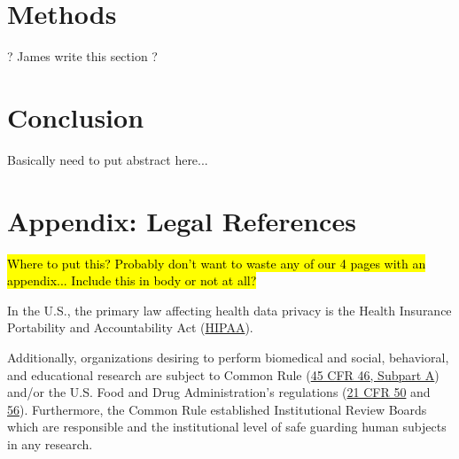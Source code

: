 \documentclass{article}
\begin{document}
\section{Methods}

? James write this section ?

\section{Conclusion}

Basically need to put abstract here...

\section{Appendix: Legal References}

\hl{Where to put this? Probably don't want to waste any of our 4 pages with an appendix... Include this in body or not at all?}


In the U.S., the primary law affecting health data privacy is the Health Insurance Portability and Accountability Act (\href{https://www.hhs.gov/hipaa/for-professionals/index.html}{HIPAA}). 


Additionally, organizations desiring to perform biomedical and social, behavioral, and educational research are subject to Common Rule (\href{https://www.hhs.gov/ohrp/regulations-and-policy/regulations/45-cfr-46/index.html#subparta}{45 CFR 46, Subpart A}) and/or the U.S. Food and Drug Administration’s regulations (\href{https://www.ecfr.gov/cgi-bin/text-idx?SID=faa4b2b2900a70fbcac4a773c9da0f0f&mc=true&node=pt21.1.50&rgn=div5}{21 CFR 50} and \href{https://www.ecfr.gov/cgi-bin/text-idx?SID=faa4b2b2900a70fbcac4a773c9da0f0f&mc=true&node=pt21.1.56&rgn=div5}{56}). Furthermore, the Common Rule established Institutional Review Boards which are responsible and the institutional level of safe guarding human subjects in any research. 




\end{document}
